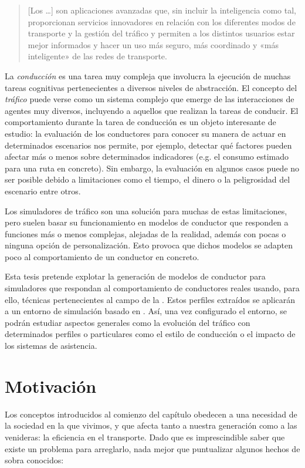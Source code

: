 \blockquote{[Los  \ldots] son aplicaciones avanzadas que, sin incluir la inteligencia como tal, proporcionan servicios innovadores en relación con los diferentes modos de transporte y la gestión del tráfico y permiten a los distintos usuarios estar mejor informados y hacer un uso más seguro, más coordinado y «más inteligente» de las redes de transporte.}

La \textit{conducción} es una tarea muy compleja que involucra la ejecución de muchas tareas cognitivas pertenecientes a diversos niveles de abstracción. El concepto del \textit{tráfico} puede verse como un sistema complejo que emerge de las interacciones de agentes muy diversos, incluyendo a aquellos que realizan la tareas de conducir. El comportamiento durante la tarea de conducción es un objeto interesante de estudio: la evaluación de los conductores para conocer su manera de actuar en determinados escenarios nos permite, por ejemplo, detectar qué factores pueden afectar más o menos sobre determinados indicadores (e.g. el consumo estimado para una ruta en concreto). Sin embargo, la evaluación en algunos casos puede no ser posible debido a limitaciones como el tiempo, el dinero o la peligrosidad del escenario entre otros.

Los simuladores de tráfico son una solución para muchas de estas limitaciones, pero suelen basar su funcionamiento en modelos de conductor que responden a funciones más o menos complejas, alejadas de la realidad, además con pocas o ninguna opción de personalización. Esto provoca que dichos modelos se adapten poco al comportamiento de un conductor en concreto.

Esta tesis pretende explotar la generación de modelos de conductor para simuladores que respondan al comportamiento de conductores reales usando, para ello, técnicas pertenecientes al campo de la . Estos perfiles extraídos se aplicarán a un entorno de simulación basado en . Así, una vez configurado el entorno, se podrán estudiar aspectos generales como la evolución del tráfico con determinados perfiles o particulares como el estilo de conducción o el impacto de los sistemas de asistencia.

\section{Motivación}

Los conceptos introducidos al comienzo del capítulo obedecen a una necesidad de la sociedad en la que vivimos, y que afecta tanto a nuestra generación como a las venideras: la eficiencia en el transporte. Dado que es imprescindible saber que existe un problema para arreglarlo, nada mejor que puntualizar algunos hechos de sobra conocidos:

